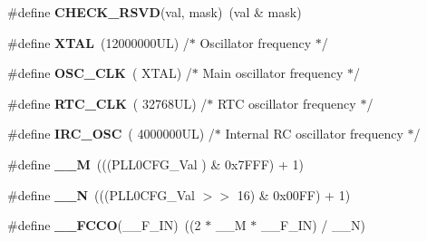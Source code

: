 \begin{DoxyCompactItemize}
\item 
\hypertarget{group___l_p_c17xx___system___defines_ga098e4b07ffb372fafb9aefd1a2393136}{\#define {\bfseries \-C\-H\-E\-C\-K\-\_\-\-R\-S\-V\-D}(val, mask)~(val \& mask)}\label{group___l_p_c17xx___system___defines_ga098e4b07ffb372fafb9aefd1a2393136}

\item 
\hypertarget{group___l_p_c17xx___system___defines_ga3cad0f9b3c40159bd2fbd7f5e60f2fff}{\#define {\bfseries \-X\-T\-A\-L}~(12000000\-U\-L)        /$\ast$ Oscillator frequency               $\ast$/}\label{group___l_p_c17xx___system___defines_ga3cad0f9b3c40159bd2fbd7f5e60f2fff}

\item 
\hypertarget{group___l_p_c17xx___system___defines_ga4dd4b4d2e3d60ee802944cb301aed687}{\#define {\bfseries \-O\-S\-C\-\_\-\-C\-L\-K}~(      \-X\-T\-A\-L)        /$\ast$ \-Main oscillator frequency          $\ast$/}\label{group___l_p_c17xx___system___defines_ga4dd4b4d2e3d60ee802944cb301aed687}

\item 
\hypertarget{group___l_p_c17xx___system___defines_ga80e62c38e7452c92057864f26034ee82}{\#define {\bfseries \-R\-T\-C\-\_\-\-C\-L\-K}~(   32768\-U\-L)        /$\ast$ R\-T\-C oscillator frequency           $\ast$/}\label{group___l_p_c17xx___system___defines_ga80e62c38e7452c92057864f26034ee82}

\item 
\hypertarget{group___l_p_c17xx___system___defines_gae0a03eb01e572e1df99df1515ac20290}{\#define {\bfseries \-I\-R\-C\-\_\-\-O\-S\-C}~( 4000000\-U\-L)        /$\ast$ Internal R\-C oscillator frequency   $\ast$/}\label{group___l_p_c17xx___system___defines_gae0a03eb01e572e1df99df1515ac20290}

\item 
\hypertarget{group___l_p_c17xx___system___defines_ga1f52a4afe1c11be1226f3acece869e27}{\#define {\bfseries \-\_\-\-\_\-\-M}~(((\-P\-L\-L0\-C\-F\-G\-\_\-\-Val      ) \& 0x7\-F\-F\-F) + 1)}\label{group___l_p_c17xx___system___defines_ga1f52a4afe1c11be1226f3acece869e27}

\item 
\hypertarget{group___l_p_c17xx___system___defines_gafd6797d8d70b1439f9a2d4cc52da7266}{\#define {\bfseries \-\_\-\-\_\-\-N}~(((\-P\-L\-L0\-C\-F\-G\-\_\-\-Val $>$$>$ 16) \& 0x00\-F\-F) + 1)}\label{group___l_p_c17xx___system___defines_gafd6797d8d70b1439f9a2d4cc52da7266}

\item 
\hypertarget{group___l_p_c17xx___system___defines_ga131aeb1747fc0ab534722df8885285f8}{\#define {\bfseries \-\_\-\-\_\-\-F\-C\-C\-O}(\-\_\-\-\_\-\-F\-\_\-\-I\-N)~((2 $\ast$ \-\_\-\-\_\-\-M $\ast$ \-\_\-\-\_\-\-F\-\_\-\-I\-N) / \-\_\-\-\_\-\-N)}\label{group___l_p_c17xx___system___defines_ga131aeb1747fc0ab534722df8885285f8}


\end{DoxyCompactItemize}
